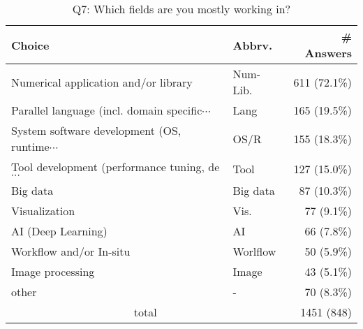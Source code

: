 \begin{table}[htb]%
\begin{center}%
\caption{Q7: Which fields are you mostly working in?}%
\label{tab:Q7-ans}%
\begin{tabular}{l|l|r}%
\hline%
Choice & Abbrv. & \# Answers \\%
\hline%
Numerical application and/or library & Num-Lib. & 611 (72.1\%) \\%
{\small Parallel language (incl. domain specific$\cdots$} & Lang & 165 (19.5\%) \\%
{\small System software development (OS, runtime$\cdots$} & OS/R & 155 (18.3\%) \\%
{\small Tool development (performance tuning, de$\cdots$} & Tool & 127 (15.0\%) \\%
Big data & Big data & 87 (10.3\%) \\%
Visualization & Vis. & 77 (9.1\%) \\%
AI (Deep Learning) & AI & 66 (7.8\%) \\%
Workflow and/or In-situ & Worlflow & 50 (5.9\%) \\%
Image processing & Image & 43 (5.1\%) \\%
other & - & 70 (8.3\%) \\%
\hline%
\multicolumn{2}{c}{total} & 1451 (848)\\%
\hline%
\end{tabular}%
\end{center}%
\end{table}%
